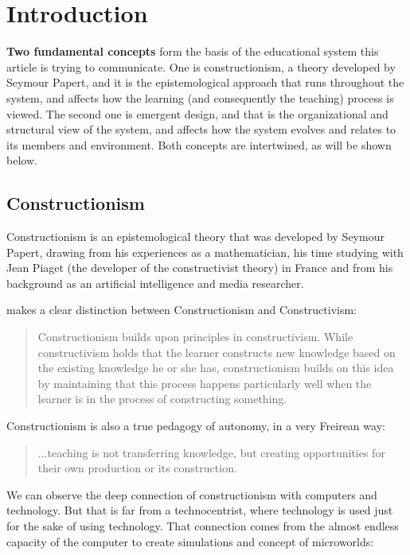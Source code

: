 \section{Introduction}


\textbf{Two fundamental concepts} form the basis of the educational system this article is trying to
communicate. One is constructionism, a theory developed by Seymour Papert, and
it is the epistemological approach that runs throughout the system, and affects
how the learning (and consequently the teaching) process is viewed. The second
one is emergent design, and that is the organizational and structural view of
the system, and affects how the system evolves and relates to its members and
environment. Both concepts are intertwined, as will be shown below. 

\subsection{Constructionism}
Constructionism is an epistemological theory that was developed by Seymour
Papert, drawing from his experiences as a mathematician, his time studying with
Jean Piaget (the developer of the constructivist theory) in France and from his
background as an artificial intelligence and media researcher.

\cite{education:cavallo_building_knowledge} makes a clear distinction between Constructionism and
Constructivism:

\begin{quote}
  Constructionism builds upon principles in constructivism. While constructivism
  holds that the learner constructs new knowledge based on the existing knowledge
  he or she has, constructionism builds on this idea by maintaining that this
  process happens particularly well when the learner is in the process of
  constructing something.                   
  
\end{quote}

Constructionism is also a true pedagogy of autonomy, in a very Freirean way:
\begin{quote}
...teaching is not transferring knowledge, but creating opportunities for their own
production or its construction.
\cite{education:paulo_freire__pedagogia_da_autonomia}
\end{quote}

We can observe the deep connection of constructionism with computers and
technology. But that is far from a technocentrist, where technology is used just
for the sake of using technology. That connection comes from the almost endless
capacity of the computer to create simulations and concept of microworlds:

